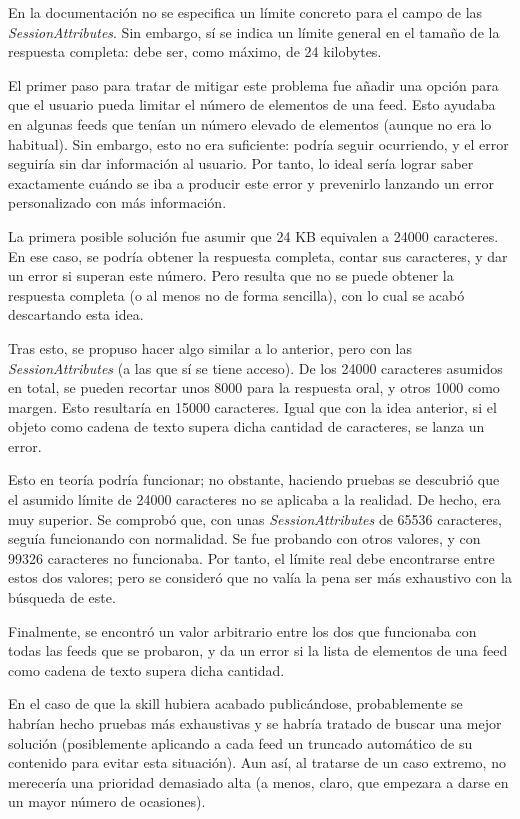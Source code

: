 \documentclass[11pt,spanish,listoffigures,listoftables,table,hyphens,dvipsnames]{tfgetsinf}
\begin{document}
En la documentación no se especifica un límite concreto para el campo de las \emph{SessionAttributes}. Sin embargo, sí se indica un límite general en el tamaño de la respuesta completa: debe ser, como máximo, de 24 kilobytes.

El primer paso para tratar de mitigar este problema fue añadir una opción para que el usuario pueda limitar el número de elementos de una feed. Esto ayudaba en algunas feeds que tenían un número elevado de elementos (aunque no era lo habitual). Sin embargo, esto no era suficiente: podría seguir ocurriendo, y el error seguiría sin dar información al usuario. Por tanto, lo ideal sería lograr saber exactamente cuándo se iba a producir este error y prevenirlo lanzando un error personalizado con más información.

La primera posible solución fue asumir que 24 KB equivalen a 24000 caracteres. En ese caso, se podría obtener la respuesta completa, contar sus caracteres, y dar un error si superan este número. Pero resulta que no se puede obtener la respuesta completa (o al menos no de forma sencilla), con lo cual se acabó descartando esta idea.

Tras esto, se propuso hacer algo similar a lo anterior, pero con las \emph{SessionAttributes} (a las que sí se tiene acceso). De los 24000 caracteres asumidos en total, se pueden recortar unos 8000 para la respuesta oral, y otros 1000 como margen. Esto resultaría en 15000 caracteres. Igual que con la idea anterior, si el objeto como cadena de texto supera dicha cantidad de caracteres, se lanza un error.

Esto en teoría podría funcionar; no obstante, haciendo pruebas se descubrió que el asumido límite de 24000 caracteres no se aplicaba a la realidad. De hecho, era muy superior. Se comprobó que, con unas \emph{SessionAttributes} de 65536 caracteres, seguía funcionando con normalidad. Se fue probando con otros valores, y con 99326 caracteres no funcionaba. Por tanto, el límite real debe encontrarse entre estos dos valores; pero se consideró que no valía la pena ser más exhaustivo con la búsqueda de este.

Finalmente, se encontró un valor arbitrario entre los dos que funcionaba con todas las feeds que se probaron, y da un error si la lista de elementos de una feed como cadena de texto supera dicha cantidad.

En el caso de que la skill hubiera acabado publicándose, probablemente se habrían hecho pruebas más exhaustivas y se habría tratado de buscar una mejor solución (posiblemente aplicando a cada feed un truncado automático de su contenido para evitar esta situación). Aun así, al tratarse de un caso extremo, no merecería una prioridad demasiado alta (a menos, claro, que empezara a darse en un mayor número de ocasiones).
\end{document}
